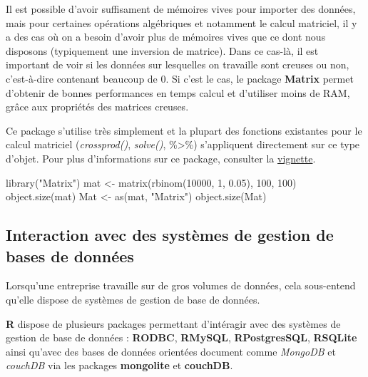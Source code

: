 \documentclass[
]{book}
\newenvironment{Shaded}{\begin{snugshade}}{\end{snugshade}}
\newcommand{\DecValTok}[1]{\textcolor[rgb]{0.00,0.00,0.81}{#1}}
\newcommand{\FloatTok}[1]{\textcolor[rgb]{0.00,0.00,0.81}{#1}}
\newcommand{\FunctionTok}[1]{\textcolor[rgb]{0.00,0.00,0.00}{#1}}
\newcommand{\NormalTok}[1]{#1}
\newcommand{\OtherTok}[1]{\textcolor[rgb]{0.56,0.35,0.01}{#1}}
\newcommand{\StringTok}[1]{\textcolor[rgb]{0.31,0.60,0.02}{#1}}
\theoremstyle{definition}
\theoremstyle{definition}
\theoremstyle{definition}
\theoremstyle{definition}
\theoremstyle{remark}
\begin{document}
Il est possible d'avoir suffisament de mémoires vives pour importer des données, mais pour certaines opérations algébriques et notamment le calcul matriciel, il y a des cas où on a besoin d'avoir plus de mémoires vives que ce dont nous disposons (typiquement une inversion de matrice). Dans ce cas-là, il est important de voir si les données sur lesquelles on travaille sont creuses ou non, c'est-à-dire contenant beaucoup de 0. Si c'est le cas, le package \textbf{Matrix} permet d'obtenir de bonnes performances en temps calcul et d'utiliser moins de RAM, grâce aux propriétés des matrices creuses.

Ce package s'utilise très simplement et la plupart des fonctions existantes pour le calcul matriciel (\emph{crossprod()}, \emph{solve()}, \%\textgreater\%) s'appliquent directement sur ce type d'objet. Pour plus d'informations sur ce package, consulter la \href{https://cran.r-project.org/web/packages/Matrix/vignettes/Intro2Matrix.pdf}{vignette}.

\begin{Shaded}
\begin{Highlighting}[]
\FunctionTok{library}\NormalTok{(}\StringTok{"Matrix"}\NormalTok{)}
\NormalTok{mat }\OtherTok{\textless{}{-}} \FunctionTok{matrix}\NormalTok{(}\FunctionTok{rbinom}\NormalTok{(}\DecValTok{10000}\NormalTok{, }\DecValTok{1}\NormalTok{, }\FloatTok{0.05}\NormalTok{), }\DecValTok{100}\NormalTok{, }\DecValTok{100}\NormalTok{)}
\FunctionTok{object.size}\NormalTok{(mat)}
\NormalTok{Mat }\OtherTok{\textless{}{-}} \FunctionTok{as}\NormalTok{(mat, }\StringTok{"Matrix"}\NormalTok{)}
\FunctionTok{object.size}\NormalTok{(Mat)}
\end{Highlighting}
\end{Shaded}

\hypertarget{interaction-avec-des-systuxe8mes-de-gestion-de-bases-de-donnuxe9es}{%
\subsection{Interaction avec des systèmes de gestion de bases de données}\label{interaction-avec-des-systuxe8mes-de-gestion-de-bases-de-donnuxe9es}}

Lorsqu'une entreprise travaille sur de gros volumes de données, cela sous-entend qu'elle dispose de systèmes de gestion de base de données.

\textbf{R} dispose de plusieurs packages permettant d'intéragir avec des systèmes de gestion de base de données : \textbf{RODBC}, \textbf{RMySQL}, \textbf{RPostgresSQL}, \textbf{RSQLite} ainsi qu'avec des bases de données orientées document comme \emph{MongoDB} et \emph{couchDB} via les packages \textbf{mongolite} et \textbf{couchDB}.
\end{document}
